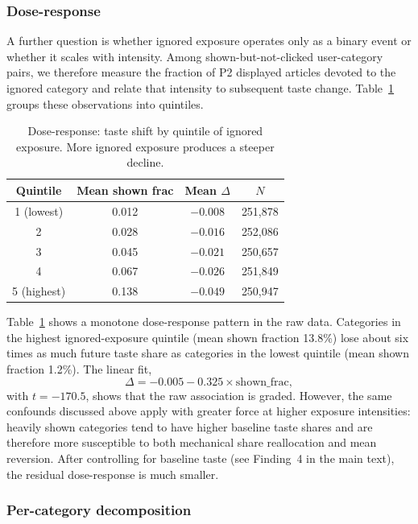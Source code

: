 \documentclass[11pt]{article}
\begin{document}
\subsubsection{Dose-response}

A further question is whether ignored exposure operates only as a binary event or whether it scales with intensity. Among shown-but-not-clicked user-category pairs, we therefore measure the fraction of P2 displayed articles devoted to the ignored category and relate that intensity to subsequent taste change. Table~\ref{tab:doseresponse} groups these observations into quintiles.

\begin{table}[ht]
\centering
\caption{Dose-response: taste shift by quintile of ignored exposure. More ignored exposure produces a steeper decline.}
\label{tab:doseresponse}
\begin{tabular}{cccc}
\toprule
Quintile & Mean shown frac & Mean $\Delta$ & $N$ \\
\midrule
1 (lowest) & 0.012 & $-0.008$ & 251,878 \\
2 & 0.028 & $-0.016$ & 252,086 \\
3 & 0.045 & $-0.021$ & 250,657 \\
4 & 0.067 & $-0.026$ & 251,849 \\
5 (highest) & 0.138 & $\mathbf{-0.049}$ & 250,947 \\
\bottomrule
\end{tabular}
\end{table}
\FloatBarrier

Table~\ref{tab:doseresponse} shows a monotone dose-response pattern in the raw data. Categories in the highest ignored-exposure quintile (mean shown fraction 13.8\%) lose about six times as much future taste share as categories in the lowest quintile (mean shown fraction 1.2\%). The linear fit,
\[
\Delta = -0.005 - 0.325 \times \text{shown\_frac},
\]
with $t=-170.5$, shows that the raw association is graded. However, the same confounds discussed above apply with greater force at higher exposure intensities: heavily shown categories tend to have higher baseline taste shares and are therefore more susceptible to both mechanical share reallocation and mean reversion. After controlling for baseline taste (see Finding~4 in the main text), the residual dose-response is much smaller.

\subsubsection{Per-category decomposition}
\end{document}
